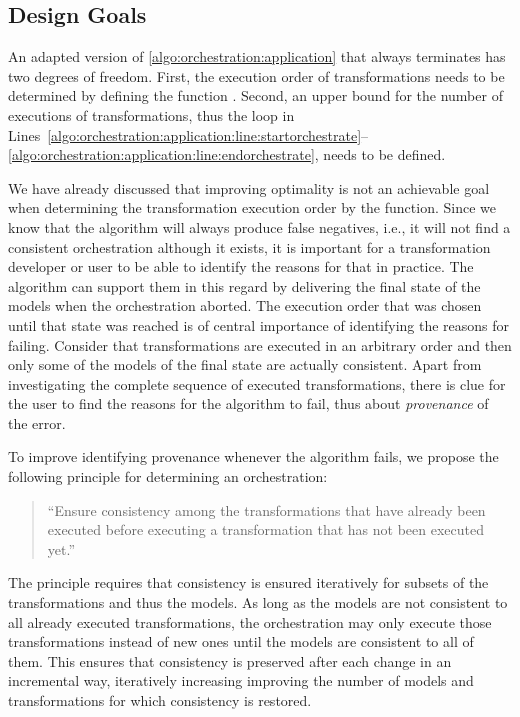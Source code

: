 
\subsection{Design Goals}
\label{chap:orchestration:algorithm:goals}

An adapted version of \autoref{algo:orchestration:application} that always terminates has two degrees of freedom.
First, the execution order of transformations needs to be determined by defining the function .
Second, an upper bound for the number of executions of transformations, thus the loop in Lines~\ref{algo:orchestration:application:line:startorchestrate}--\ref{algo:orchestration:application:line:endorchestrate}, needs to be defined.

We have already discussed that improving optimality is not an achievable goal when determining the transformation execution order by the  function.
Since we know that the algorithm will always produce false negatives, i.e., it will not find a consistent orchestration although it exists, it is important for a transformation developer or user to be able to identify the reasons for that in practice.
The algorithm can support them in this regard by delivering the final state of the models when the orchestration aborted.
The execution order that was chosen until that state was reached is of central importance of identifying the reasons for failing.
Consider that transformations are executed in an arbitrary order and then only some of the models of the final state are actually consistent.
Apart from investigating the complete sequence of executed transformations, there is clue for the user to find the reasons for the algorithm to fail, thus about \emph{provenance} of the error.

To improve identifying provenance whenever the algorithm fails, we propose the following principle for determining an orchestration:
\begin{quote}
    \enquote{Ensure consistency among the transformations that have already been executed before executing a transformation that has not been executed yet.} \cite{gleitze2020orchestration}
\end{quote}
The principle requires that consistency is ensured iteratively for subsets of the transformations and thus the models.
As long as the models are not consistent to all already executed transformations, the orchestration may only execute those transformations instead of new ones until the models are consistent to all of them.
This ensures that consistency is preserved after each change in an incremental way, iteratively increasing improving the number of models and transformations for which consistency is restored.

